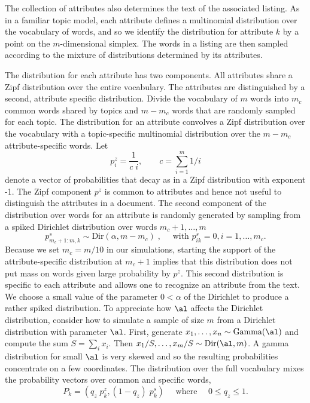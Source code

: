 \documentclass[12pt]{article}
\begin{document}
The collection of attributes also determines the text of the associated listing.  As in a familiar topic model, each attribute defines a multinomial distribution over the vocabulary of words, and so we identify the distribution for attribute $k$ by a point on the $m$-dimensional simplex.  The words in a listing are then sampled according to the mixture of distributions determined by its attributes.  


The distribution for each attribute has two components.  All attributes share a Zipf distribution over the entire vocabulary.  The attributes are distinguished by a second, attribute specific distribution.  Divide the vocabulary of $m$ words into $m_c$ common words shared by topics and $m - m_c$ words that are randomly sampled for each topic.  The distribution for an attribute convolves a Zipf distribution over the vocabulary with a topic-specific multinomial distribution over the $m - m_c$ attribute-specific words. Let 
\begin{equation*}
     p^z_i = \frac{1}{c\;i}, \qquad c = \sum_{i=1}^{m} 1/i 
\end{equation*}
denote a vector of probabilities that decay as in a Zipf distribution with exponent -1. The Zipf component $p^z$ is common to attributes and hence not useful to distinguish the attributes in a document. The second component of the distribution over words for an attribute is randomly generated by  sampling from a spiked Dirichlet distribution over words $m_c+1, \ldots,m$  
 \begin{equation}
     p^s_{m_c+1:m,k} \sim  \mbox{Dir}(\alpha,m-m_c)  \;, \quad \mbox{ with } p^s_{ik} = 0, i = 1,\ldots,m_c.
\label{eq:ps}
\end{equation}
Because we set $m_c = m/10$ in our simulations,  starting the support of the attribute-specific distribution at $m_c+1$ implies that this distribution does not put mass on words given large probability by $p^z$. This second distribution is specific to each attribute and allows one to recognize an attribute from the text.  We choose a small value of the parameter $0 < \alpha$ of the Dirichlet to produce a rather spiked distribution.   To appreciate how $\al$ affects the Dirichlet distribution, consider how to simulate a sample of size $m$ from a Dirichlet distribution with parameter $\al$.  First, generate $x_1,\ldots,x_n \sim \mbox{Gamma}(\al)$ and compute the sum $S = \sum_i x_i$.  Then $x_1/S,\ldots,x_m/S \sim \mbox{Dir}(\al,m)$.  A gamma distribution for small $\al$ is very skewed and so the resulting probabilities concentrate on a few coordinates. The distribution over the full vocabulary mixes the probability vectors over common and specific words, 
\begin{equation}
  P_k = (q_z \; p_k^z, (1-q_z) \; p_k^s)  \quad \mbox{ where } \quad 0 \le q_z \le 1.
  \label{eq:Pk}
\end{equation}
\end{document}
